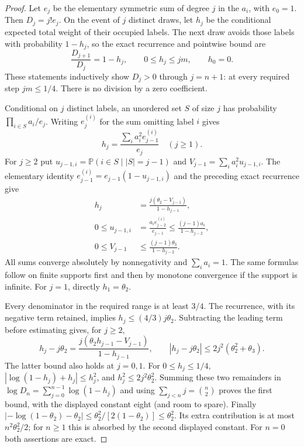 \documentclass[11pt]{article}
\theoremstyle{definition}
\begin{document}
\begin{proof}
Let $e_j$ be the elementary symmetric sum of degree $j$ in
the $a_i$, with $e_0=1$.
Then $D_j=j!e_j$.
On the event of $j$ distinct draws, let $h_j$ be the
conditional expected total weight of their occupied labels.
The next draw avoids those labels with probability $1-h_j$,
so the exact recurrence and pointwise bound are
\begin{equation}
 \frac{D_{j+1}}{D_j}=1-h_j,\qquad
 0\le h_j\le jm,\qquad h_0=0.
 \label{eq:pair-collision-exact-hazard}
\end{equation}
These statements inductively show $D_j>0$ through $j=n+1$:
at every required step $jm\le1/4$.
There is no division by a zero coefficient.

Conditional on $j$ distinct labels, an unordered set $S$
of size $j$ has probability $\prod_{i\in S}a_i/e_j$.
Writing $e_j^{(i)}$ for the sum omitting label $i$ gives
\[
 h_j=\frac{\sum_i a_i^2e_{j-1}^{(i)}}{e_j}
                                      \quad(j\ge1).
\]
For $j\ge2$ put
$u_{j-1,i}=\mathbb P(i\in S\mid |S|=j-1)$ and
$V_{j-1}=\sum_i a_i^2u_{j-1,i}$.
The elementary identity
$e_{j-1}^{(i)}=e_{j-1}(1-u_{j-1,i})$
and the preceding exact recurrence give
\begin{equation}
 \begin{aligned}
 h_j&=\frac{j(\theta_2-V_{j-1})}{1-h_{j-1}},\\
 0\le u_{j-1,i}
   &=\frac{a_i e_{j-2}^{(i)}}{e_{j-1}}
       \le\frac{(j-1)a_i}{1-h_{j-2}},\\
 0\le V_{j-1}
   &\le\frac{(j-1)\theta_3}{1-h_{j-2}}.
 \end{aligned}
 \label{eq:pair-collision-signed-recurrence}
\end{equation}
All sums converge absolutely by nonnegativity and $\sum_i a_i=1$.
The same formulas follow on finite supports first and then by
monotone convergence if the support is infinite.
For $j=1$, directly $h_1=\theta_2$.

Every denominator in the required range is at least $3/4$.
The recurrence, with its negative term retained, implies
$h_j\le(4/3)j\theta_2$.
Subtracting the leading term before estimating gives, for $j\ge2$,
\[
 h_j-j\theta_2
   =\frac{j(\theta_2h_{j-1}-V_{j-1})}{1-h_{j-1}},
 \qquad
 |h_j-j\theta_2|
   \le2j^2(\theta_2^2+\theta_3).
\]
The latter bound also holds at $j=0,1$.
For $0\le h_j\le1/4$,
$|\log(1-h_j)+h_j|\le h_j^2$, and
$h_j^2\le2j^2\theta_2^2$.
Summing these two remainders in
$\log D_n=\sum_{j=0}^{n-1}\log(1-h_j)$ and using
$\sum_{j<n}j=\binom n2$ proves the first bound, with the
displayed constant eight (and room to spare).
Finally
$|-\log(1-\theta_2)-\theta_2|
\le\theta_2^2/[2(1-\theta_2)]\le\theta_2^2$.
Its extra contribution is at most $n^2\theta_2^2/2$;
for $n\ge1$ this is absorbed by the second displayed constant.
For $n=0$ both assertions are exact.
\end{proof}
\end{document}
